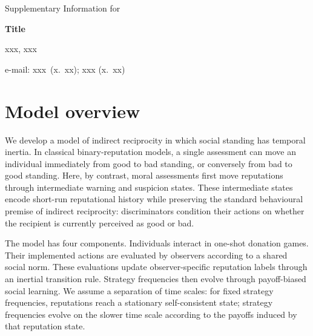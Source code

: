 \documentclass[fleqn,10pt]{wlscirep}
\begin{document}
\newpage
\begin{center}
  \Huge Supplementary Information for
\end{center}

\noindent
\textbf{\Huge Title}
\vspace{2em}

\noindent
{\Large xxx, xxx}
\vspace{1em} %

\noindent
e-mail: xxx~(x.~xx); xxx (x.~xx)


\tableofcontents

\renewcommand{\theequation}{S\arabic{equation}}
\setcounter{equation}{0}

\let\oldsection\thesection
\renewcommand{\thesection}{Supplementary Note~\arabic{section}}
\renewcommand{\thesubsection}{\oldsection.\arabic{subsection}}

\renewcommand{\thefigure}{S\arabic{figure}}
\setcounter{figure}{0}

\newpage

\section*{Model overview}

We develop a model of indirect reciprocity in which social standing has temporal inertia. In classical binary-reputation models, a single assessment can move an individual immediately from good to bad standing, or conversely from bad to good standing. Here, by contrast, moral assessments first move reputations through intermediate warning and suspicion states. These intermediate states encode short-run reputational history while preserving the standard behavioural premise of indirect reciprocity: discriminators condition their actions on whether the recipient is currently perceived as good or bad.

The model has four components. Individuals interact in one-shot donation games. Their implemented actions are evaluated by observers according to a shared social norm. These evaluations update observer-specific reputation labels through an inertial transition rule. Strategy frequencies then evolve through payoff-biased social learning. We assume a separation of time scales: for fixed strategy frequencies, reputations reach a stationary self-consistent state; strategy frequencies evolve on the slower time scale according to the payoffs induced by that reputation state.
\end{document}
